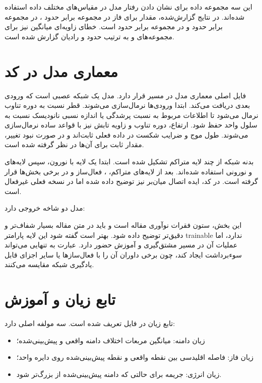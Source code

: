 این سه مجموعه داده برای نشان دادن رفتار مدل در مقیاس‌های مختلف داده استفاده شده‌اند. در نتایج گزارش‌شده، مقدار  برای فاز در مجموعه  برابر حدود ، در مجموعه  برابر حدود  و در مجموعه  برابر حدود  است. خطای زاویه‌ای میانگین نیز برای مجموعه‌های  و  به ترتیب حدود  و  رادیان گزارش شده است.



\section{معماری مدل در کد}
فایل اصلی معماری مدل در مسیر  قرار دارد. مدل یک شبکه عصبی  است که ورودی  بعدی دریافت می‌کند. ابتدا ورودی‌ها نرمال‌سازی می‌شوند. قطر نسبت به دوره تناوب نرمال می‌شود تا اطلاعات مربوط به نسبت پرشدگی یا اندازه نسبی نانودیسک نسبت به سلول واحد حفظ شود. ارتفاع، دوره تناوب و زاویه تابش نیز با قواعد ساده نرمال‌سازی می‌شوند. طول موج و ضرایب شکست در داده فعلی ثابت‌اند و در صورت نبود تغییر، مقدار ثابت برای آن‌ها در نظر گرفته شده است.

بدنه شبکه از چند لایه متراکم تشکیل شده است. ابتدا یک لایه با  نورون، سپس لایه‌های  و  نورونی استفاده شده‌اند. بعد از لایه‌های متراکم، ، فعال‌ساز  و در برخی بخش‌ها  قرار گرفته است. در کد، ایده اتصال میان‌بر نیز توضیح داده شده اما در نسخه فعلی غیرفعال است.

مدل دو شاخه خروجی دارد:


این بخش، ستون فقرات نوآوری مقاله است و باید در متن مقاله بسیار شفاف‌تر و دقیق‌تر توضیح داده شود. بهتر است گفته شود این لایه پارامتر trainable ندارد، اما عملیات آن در مسیر مشتق‌گیری و آموزش حضور دارد. عبارت  به تنهایی می‌تواند سوءبرداشت ایجاد کند، چون برخی داوران آن را با فعال‌سازها یا سایر اجزای قابل یادگیری شبکه مقایسه می‌کنند.

\section{تابع زیان و آموزش}
تابع زیان در فایل  تعریف شده است. سه مولفه اصلی دارد:

\begin{itemize}
	\item زیان دامنه: میانگین مربعات اختلاف دامنه واقعی و پیش‌بینی‌شده؛
	\item زیان فاز: فاصله اقلیدسی بین نقطه واقعی و نقطه پیش‌بینی‌شده روی دایره واحد؛
	\item زیان انرژی: جریمه برای حالتی که دامنه پیش‌بینی‌شده از  بزرگ‌تر شود.
\end{itemize}

